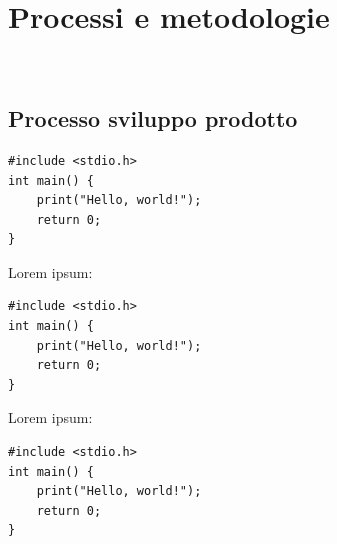 \chapter{Processi e metodologie}
\label{chap:processi-metodologie}

\

\section{Processo sviluppo prodotto}
\lipsum[1-2]

\begin{listing}[H]
\begin{verbatim}
#include <stdio.h>
int main() {
    print("Hello, world!");
    return 0;
}
\end{verbatim}
\caption{Example of code}
\label{listing:b}
\end{listing}

Lorem ipsum:
\begin{listing}[H]
\begin{verbatim}
#include <stdio.h>
int main() {
    print("Hello, world!");
    return 0;
}
\end{verbatim}
\caption{Example of code}
\label{listing:b-2}
\end{listing}

Lorem ipsum:
\begin{listing}[H]
\begin{verbatim}
#include <stdio.h>
int main() {
    print("Hello, world!");
    return 0;
}
\end{verbatim}
\caption{Example of code}
\label{listing:b-3}
\end{listing}

\newpage